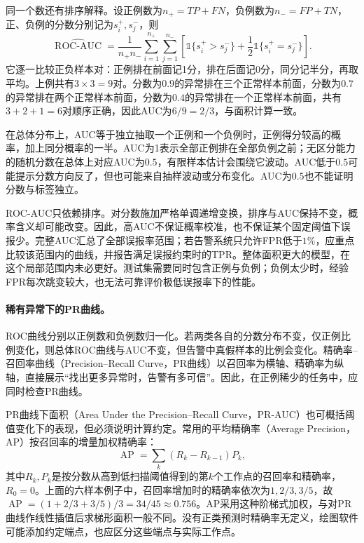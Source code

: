 同一个数还有排序解释。设正例数为$n_+=TP+FN$，负例数为$n_-=FP+TN$，正、负例的分数分别记为$s_i^+,s_j^-$，则
\begin{equation}
 \widehat{\operatorname{ROC\text{-}AUC}}
 =\frac{1}{n_+n_-}\sum_{i=1}^{n_+}\sum_{j=1}^{n_-}
 \left[\mathbb 1\{s_i^+>s_j^-\}
 +\frac12\mathbb 1\{s_i^+=s_j^-\}\right].
 \label{eq:classification-auc-pairs}
\end{equation}
它逐一比较正负样本对：正例排在前面记1分，排在后面记0分，同分记半分，再取平均。上例共有$3\times3=9$对。分数为$0.9$的异常排在三个正常样本前面，分数为$0.7$的异常排在两个正常样本前面，分数为$0.4$的异常排在一个正常样本前面，共有$3+2+1=6$对顺序正确，因此AUC为$6/9=2/3$，与面积计算一致。

在总体分布上，AUC等于独立抽取一个正例和一个负例时，正例得分较高的概率，加上同分概率的一半。AUC为1表示全部正例排在全部负例之前；无区分能力的随机分数在总体上对应AUC为$0.5$，有限样本估计会围绕它波动。AUC低于$0.5$可能提示分数方向反了，但也可能来自抽样波动或分布变化。AUC为$0.5$也不能证明分数与标签独立。

ROC-AUC只依赖排序。对分数施加严格单调递增变换，排序与AUC保持不变，概率含义却可能改变。因此，高AUC不保证概率校准，也不保证某个固定阈值下误报少。完整AUC汇总了全部误报率范围；若告警系统只允许FPR低于$1\%$，应重点比较该范围内的曲线，并报告满足误报约束时的TPR。整体面积更大的模型，在这个局部范围内未必更好。测试集需要同时包含正例与负例；负例太少时，经验FPR每次跳变较大，也无法可靠评价极低误报率下的性能。

\paragraph{稀有异常下的PR曲线。}
ROC曲线分别以正例数和负例数归一化。若两类各自的分数分布不变，仅正例比例变化，则总体ROC曲线与AUC不变，但告警中真假样本的比例会变化。精确率--召回率曲线（Precision--Recall Curve，PR曲线）以召回率为横轴、精确率为纵轴，直接展示“找出更多异常时，告警有多可信”。因此，在正例稀少的任务中，应同时检查PR曲线。

PR曲线下面积（Area Under the Precision--Recall Curve，PR-AUC）也可概括阈值变化下的表现，但必须说明计算约定。常用的平均精确率（Average Precision，AP）按召回率的增量加权精确率：
\begin{equation}
 \operatorname{AP}=\sum_k(R_k-R_{k-1})P_k,
 \label{eq:classification-average-precision}
\end{equation}
其中$R_k,P_k$是按分数从高到低扫描阈值得到的第$k$个工作点的召回率和精确率，$R_0=0$。上面的六样本例子中，召回率增加时的精确率依次为$1,2/3,3/5$，故$\operatorname{AP}=(1+2/3+3/5)/3=34/45\approx0.756$。AP采用这种阶梯式加权，与对PR曲线作线性插值后求梯形面积一般不同。没有正类预测时精确率无定义，绘图软件可能添加约定端点，也应区分这些端点与实际工作点。

